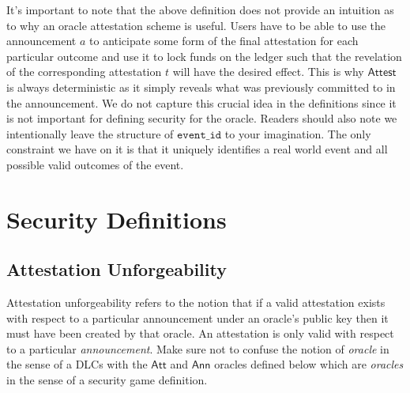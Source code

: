 \documentclass[runningheads]{llncs}
\newcommand{\eventid}{\mathtt{event\_id}}
\newcommand{\Attest}{\mathsf{Attest}}
\newcommand{\AnnO}{\mathsf{Ann}}
\newcommand{\AttO}{\mathsf{Att}}
\newcommand{\att}{t}
\newcommand{\ann}{a}
\begin{document}
It's important to note that the above definition does not provide an intuition as to why an oracle attestation scheme is useful.
Users have to be able to use the announcement $\ann$ to anticipate some form of the final attestation for each particular outcome and use it to lock funds on the ledger such that the revelation of the corresponding attestation $\att$ will have the desired effect.
This is why $\Attest$ is always deterministic as it simply reveals what was previously committed to in the announcement.
We do not capture this crucial idea in the definitions since it is not important for defining security for the oracle.
Readers should also note we intentionally leave the structure of $\eventid$ to your imagination.
The only constraint we have on it is that it uniquely identifies a real world event and all possible valid outcomes of the event.

\section{Security Definitions}


\subsection{Attestation Unforgeability}

Attestation unforgeability refers to the notion that if a valid attestation exists with respect to a particular announcement under an oracle's public key then it must have been created by that oracle.
An attestation is only valid with respect to a particular \emph{announcement}.
Make sure not to confuse the notion of \emph{oracle} in the sense of a DLCs with the $\AttO$ and $\AnnO$ oracles defined below which are \emph{oracles} in the sense of a security game definition.
\end{document}
